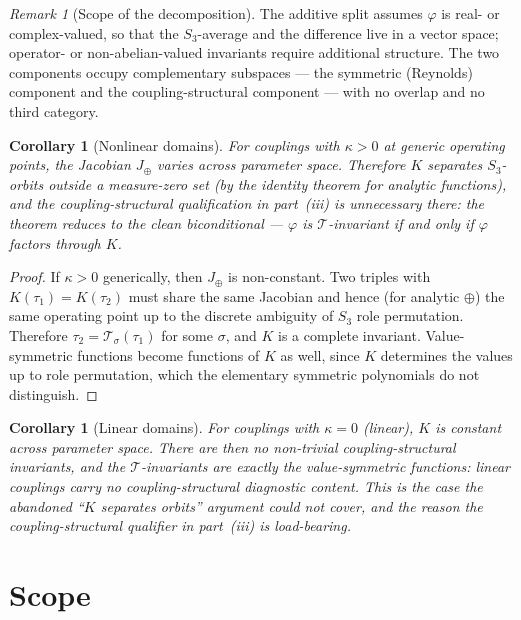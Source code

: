 \documentclass[12pt,a4paper]{article}
\theoremstyle{definition}
\theoremstyle{plain}
\newtheorem{corollary}[theorem]{Corollary}
\theoremstyle{remark}
\newtheorem{remark}{Remark}
\newcommand{\T}{\mathcal{T}}
\begin{document}
\begin{remark}[Scope of the decomposition]
The additive split assumes $\varphi$ is real- or complex-valued, so that the $S_3$-average and the difference live in a vector space; operator- or non-abelian-valued invariants require additional structure. The two components occupy complementary subspaces --- the symmetric (Reynolds) component and the coupling-structural component --- with no overlap and no third category.
\end{remark}

\begin{corollary}[Nonlinear domains]\label{cor:nonlinear}
For couplings with $\kappa > 0$ at generic operating points, the Jacobian $J_\oplus$ varies across parameter space. Therefore $K$ separates $S_3$-orbits outside a measure-zero set (by the identity theorem for analytic functions), and the coupling-structural qualification in part~(iii) is unnecessary there: the theorem reduces to the clean biconditional --- $\varphi$ is $\T$-invariant if and only if $\varphi$ factors through $K$.
\end{corollary}

\begin{proof}
If $\kappa > 0$ generically, then $J_\oplus$ is non-constant. Two triples with $K(\tau_1) = K(\tau_2)$ must share the same Jacobian and hence (for analytic $\oplus$) the same operating point up to the discrete ambiguity of $S_3$ role permutation. Therefore $\tau_2 = \T_\sigma(\tau_1)$ for some $\sigma$, and $K$ is a complete invariant. Value-symmetric functions become functions of $K$ as well, since $K$ determines the values up to role permutation, which the elementary symmetric polynomials do not distinguish.
\end{proof}

\begin{corollary}[Linear domains]\label{cor:linear}
For couplings with $\kappa = 0$ (linear), $K$ is constant across parameter space. There are then no non-trivial coupling-structural invariants, and the $\T$-invariants are exactly the value-symmetric functions: linear couplings carry no coupling-structural diagnostic content. This is the case the abandoned ``$K$ separates orbits'' argument could not cover, and the reason the coupling-structural qualifier in part~(iii) is load-bearing.
\end{corollary}


\section{Scope}
\end{document}

